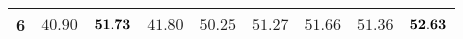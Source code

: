 \begin{table}[ht!]
\begin{tabular}{ccccccccc}
6                                       & $40.90$                              & ${\bf 51.73}$                          & $41.80$                              & $50.25$                              & $51.27$                             & $51.66$                             & $51.36$                 & ${\bf 52.63}$              \\ \hline
\end{tabular}
\end{table}

